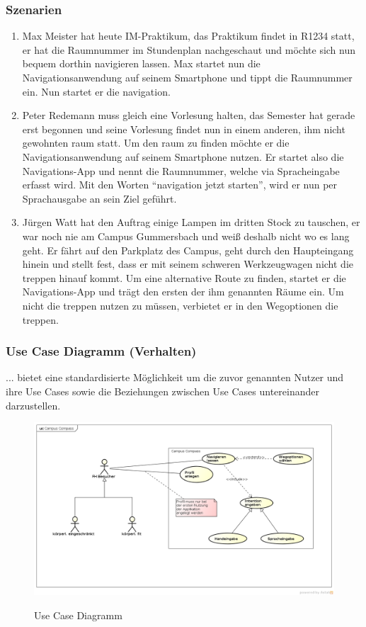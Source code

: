 \subsubsection*{Szenarien}
\begin{enumerate}
  \item Max Meister hat heute IM-Praktikum, das Praktikum findet in R1234 statt, er hat die Raumnummer im Stundenplan nachgeschaut und möchte sich nun bequem dorthin navigieren lassen. Max startet nun die Navigationsanwendung auf seinem Smartphone und tippt die Raumnummer ein. Nun startet er die \gls{navigation}.
  \item Peter Redemann muss gleich eine Vorlesung halten, das Semester hat gerade erst begonnen und seine Vorlesung findet nun in einem anderen, ihm nicht gewohnten \gls{raum} statt. Um den \gls{raum} zu finden möchte er die Navigationsanwendung auf seinem Smartphone nutzen. Er startet also die Navigations-App und nennt die Raumnummer, welche via Spracheingabe erfasst wird. Mit den Worten "`\gls{navigation} jetzt starten"', wird er nun per Sprachausgabe an sein Ziel geführt.
  \item Jürgen Watt hat den Auftrag einige Lampen im dritten Stock zu tauschen, er war noch nie am Campus Gummersbach und weiß deshalb nicht wo es lang geht. Er fährt auf den Parkplatz des Campus, geht durch den Haupteingang hinein und stellt fest, dass er mit seinem schweren Werkzeugwagen nicht die \gls{treppe}n hinauf kommt. Um eine alternative Route zu finden, startet er die Navigations-App und trägt den ersten der ihm genannten Räume ein. Um nicht die \gls{treppe}n nutzen zu müssen, verbietet er in den Wegoptionen die \gls{treppe}n.
\end{enumerate}

\newpage

\subsubsection*{Use Case Diagramm (Verhalten)}
... bietet eine standardisierte Möglichkeit um die zuvor genannten Nutzer und ihre Use Cases sowie die Beziehungen zwischen Use Cases untereinander darzustellen.

\begin{figure}[hbt]
  \centering
  \includegraphics[width=\linewidth]{img/use-case-diagram.png}
  \label{img:use-case-diagramm}
  \caption{Use Case Diagramm}
\end{figure}

